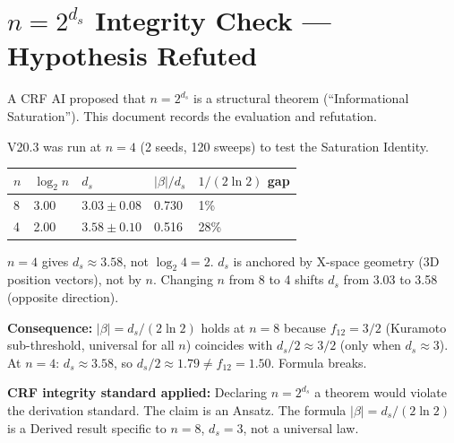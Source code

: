 \documentclass[12pt, a4paper]{article}
\begin{document}
\section{$n = 2^{d_s}$ Integrity Check --- Hypothesis Refuted}

A CRF AI proposed that $n = 2^{d_s}$ is a structural theorem (``Informational Saturation'').
This document records the evaluation and refutation.

\begin{derivedbox}[title={$n = 2^{d_s}$ Is Refuted: $n = 4$ Test}]
V20.3 was run at $n = 4$ (2 seeds, 120 sweeps) to test the Saturation Identity.

\begin{center}
\renewcommand{\arraystretch}{1.35}
\begin{tabular}{p{0.8cm} p{1.5cm} p{3cm} p{2cm} p{2.5cm}}
\toprule
$n$ & $\log_2 n$ & $d_s$ & $|\beta|/d_s$ & $1/(2\ln 2)$ gap \\
\midrule
8 & 3.00 & $3.03 \pm 0.08$ & 0.730 & 1\% \\
4 & 2.00 & $3.58 \pm 0.10$ & 0.516 & 28\% \\
\bottomrule
\end{tabular}
\end{center}

$n = 4$ gives $d_s \approx 3.58$, not $\log_2 4 = 2$.
$d_s$ is anchored by X-space geometry (3D position vectors), not by $n$.
Changing $n$ from 8 to 4 shifts $d_s$ from 3.03 to 3.58 (opposite direction).

\textbf{Consequence:} $|\beta| = d_s/(2\ln 2)$ holds at $n = 8$ because $f_{12} = 3/2$
(Kuramoto sub-threshold, universal for all $n$) coincides with $d_s/2 \approx 3/2$
(only when $d_s \approx 3$). At $n = 4$: $d_s \approx 3.58$, so $d_s/2 \approx 1.79
\neq f_{12} = 1.50$. Formula breaks.

\textbf{CRF integrity standard applied:} Declaring $n = 2^{d_s}$ a theorem would violate
the derivation standard. The claim is an Ansatz. The formula $|\beta| = d_s/(2\ln 2)$
is a Derived result specific to $n = 8$, $d_s = 3$, not a universal law.
\end{derivedbox}
\end{document}
